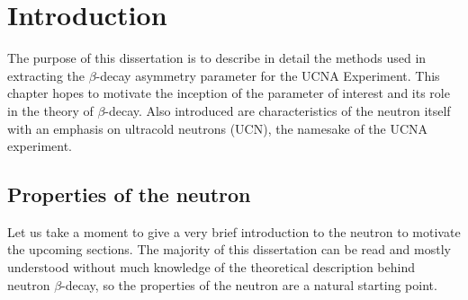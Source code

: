 \chapter{Introduction}
\label{ch:Introduction}

The purpose of this dissertation is to describe in detail
the methods used in extracting the $\beta$-decay asymmetry parameter
for the UCNA Experiment. This chapter hopes to motivate the inception
of the parameter of interest and its role in the theory of $\beta$-decay.
Also introduced are characteristics of the neutron itself with an
emphasis on ultracold neutrons (UCN), the namesake of the UCNA experiment.

\section{Properties of the neutron}
\label{sec:neutronProperties}
Let us take a moment to give a very brief introduction to the neutron to motivate the
upcoming sections. The majority of this dissertation can be read and mostly understood
without much knowledge of the theoretical description behind neutron $\beta$-decay,
so the properties of the neutron are a natural starting point.

